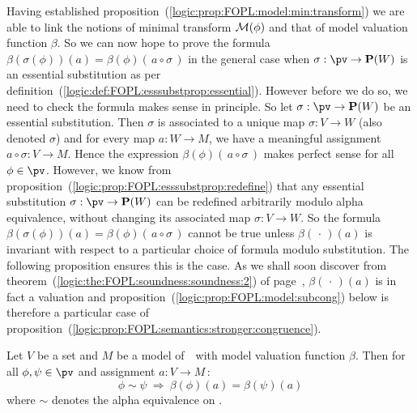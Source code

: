 Having established
proposition~(\ref{logic:prop:FOPL:model:min:transform}) we are able
to link the notions of minimal transform ${\cal M}(\phi)$ and that
of model valuation function $\beta$. So we can now hope to prove the
formula $\beta(\sigma(\phi))(a)=\beta(\phi)(\,a\circ\sigma\,)$ in
the general case when $\sigma:\pv\to{\bf P}(W)$ is an essential
substitution as per
definition~(\ref{logic:def:FOPL:esssubstprop:essential}). However
before we do so, we need to check the formula makes sense in
principle. So let $\sigma:\pv\to{\bf P}(W)$ be an essential
substitution. Then $\sigma$ is associated to a unique map
$\sigma:V\to W$ (also denoted $\sigma$) and for every map $a:W\to
M$, we have a meaningful assignment $a\circ\sigma:V\to M$. Hence the
expression $\beta(\phi)(\,a\circ\sigma\,)$ makes perfect sense for
all $\phi\in\pv$. However, we know from
proposition~(\ref{logic:prop:FOPL:esssubstprop:redefine}) that any
essential substitution $\sigma:\pv\to{\bf P}(W)$ can be redefined
arbitrarily modulo alpha equivalence, without changing its
associated map $\sigma:V\to W$. So the formula
$\beta(\sigma(\phi))(a)=\beta(\phi)(\,a\circ\sigma\,)$ cannot be
true unless $\beta(\,\cdot\,)(a)$ is invariant with respect to a
particular choice of formula modulo substitution. The following
proposition ensures this is the case. As we shall soon discover from
theorem~(\ref{logic:the:FOPL:soundness:soundness:2}) of
page~\pageref{logic:the:FOPL:soundness:soundness:2},
$\beta(\,\cdot\,)(a)$ is in fact a valuation and
proposition~(\ref{logic:prop:FOPL:model:subcong}) below is therefore
a particular case of
proposition~(\ref{logic:prop:FOPL:semantics:stronger:congruence}).
\begin{prop}\label{logic:prop:FOPL:model:subcong}
Let $V$ be a set and $M$ be a model of\, \pv\ with model valuation
function $\beta$. Then for all $\phi,\psi\in\pv$ and assignment
$a:V\to M$\,:
    \[
    \phi\sim\psi\ \Rightarrow\ \beta(\phi)(a)=\beta(\psi)(a)
    \]
where $\sim$ denotes the alpha equivalence on \pv.
\end{prop}
